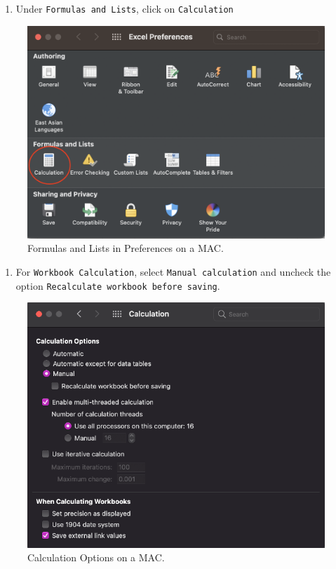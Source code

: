 \documentclass[
]{book}
\providecommand{\tightlist}{%
  \setlength{\itemsep}{0pt}\setlength{\parskip}{0pt}}
\begin{document}
\begin{enumerate}
\def\labelenumi{\arabic{enumi}.}
\setcounter{enumi}{1}
\tightlist
\item
  Under \texttt{Formulas\ and\ Lists}, click on \texttt{Calculation}
\end{enumerate}

\begin{figure}

{\centering \includegraphics[width=0.6\linewidth]{images/manual-calculation2} 

}

\caption{Formulas and Lists in Preferences on a MAC.}\label{fig:manual-calculation2}
\end{figure}

\begin{enumerate}
\def\labelenumi{\arabic{enumi}.}
\setcounter{enumi}{2}
\tightlist
\item
  For \texttt{Workbook\ Calculation}, select \texttt{Manual\ calculation} and uncheck the option \texttt{Recalculate\ workbook\ before\ saving}.
\end{enumerate}

\begin{figure}

{\centering \includegraphics[width=0.6\linewidth]{images/manual-calculation3} 

}

\caption{Calculation Options on a MAC.}\label{fig:manual-calculation3}
\end{figure}
\end{document}
